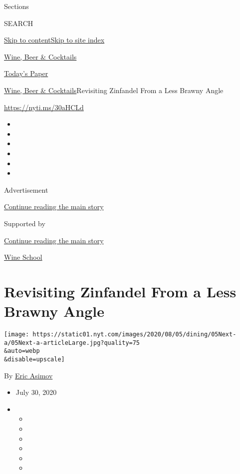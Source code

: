 Sections

SEARCH

\protect\hyperlink{site-content}{Skip to
content}\protect\hyperlink{site-index}{Skip to site index}

\href{https://www.nytimes.com/section/food/drinks}{Wine, Beer \&
Cocktails}

\href{https://myaccount.nytimes.com/auth/login?response_type=cookie\&client_id=vi}{}

\href{https://www.nytimes.com/section/todayspaper}{Today's Paper}

\href{/section/food/drinks}{Wine, Beer \& Cocktails}\textbar{}Revisiting
Zinfandel From a Less Brawny Angle

\url{https://nyti.ms/30aHCLd}

\begin{itemize}
\item
\item
\item
\item
\item
\item
\end{itemize}

Advertisement

\protect\hyperlink{after-top}{Continue reading the main story}

Supported by

\protect\hyperlink{after-sponsor}{Continue reading the main story}

\href{/column/wine-school}{Wine School}

\hypertarget{revisiting-zinfandel-from-a-less-brawny-angle}{%
\section{Revisiting Zinfandel From a Less Brawny
Angle}\label{revisiting-zinfandel-from-a-less-brawny-angle}}

\texttt{[image: https://static01.nyt.com/images/2020/08/05/dining/05Next-a/05Next-a-articleLarge.jpg?quality=75\\\&auto=webp\\\&disable=upscale]}

By \href{https://www.nytimes.com/by/eric-asimov}{Eric Asimov}

\begin{itemize}
\item
  July 30, 2020
\item
  \begin{itemize}
  \item
  \item
  \item
  \item
  \item
  \item
  \end{itemize}
\end{itemize}


